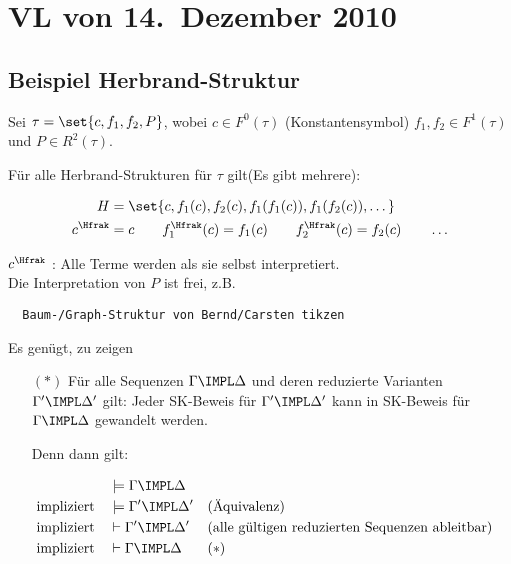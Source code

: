 \section{VL von 14.~Dezember 2010}

\subsection{Beispiel Herbrand-Struktur}

Sei $\tau = \set{c, f_1, f_2, P}$, wobei $c\in F^0(\tau)$ (Konstantensymbol)
$f_1,f_2 \in F^1(\tau)$ und $P \in R^2(\tau)$.

Für alle Herbrand-Strukturen für $\tau$ gilt(Es gibt mehrere):

\begin{align*}
  H &= \set{c, f_1(c), f_2(c), f_1(f_1(c)), f_1(f_2(c)), \dots} \\
  c^\Hfrak &= c \qquad f_1^\Hfrak(c) = f_1(c) \qquad f_2^\Hfrak(c) = f_2(c) \qquad \dots
\end{align*}

$c^\Hfrak$ : Alle Terme werden als sie selbst interpretiert.\\

Die Interpretation von $P$ ist frei, z.B.

\begin{verbatim}
  Baum-/Graph-Struktur von Bernd/Carsten tikzen
\end{verbatim}

Es genügt, zu zeigen\\
\begin{itemize}
  \item[$(*)$] Für alle Sequenzen $\Gamma\IMPL\Delta$ und deren reduzierte Varianten
  $\Gamma'\IMPL\Delta'$ gilt: Jeder SK-Beweis für $\Gamma'\IMPL\Delta'$ kann in SK-Beweis
  für $\Gamma\IMPL\Delta$ gewandelt werden.
  
  Denn dann gilt:
  
  \begin{align*}
                            &\models\Gamma \IMPL\Delta \\
    \text{impliziert} \quad &\models\Gamma'\IMPL\Delta' && \text{(Äquivalenz)} \\
    \text{impliziert} \quad &\vdash \Gamma'\IMPL\Delta' && \text{(alle gültigen reduzierten Sequenzen ableitbar)} \\
    \text{impliziert} \quad &\vdash \Gamma \IMPL\Delta  && (*)
  \end{align*}
\end{itemize}


